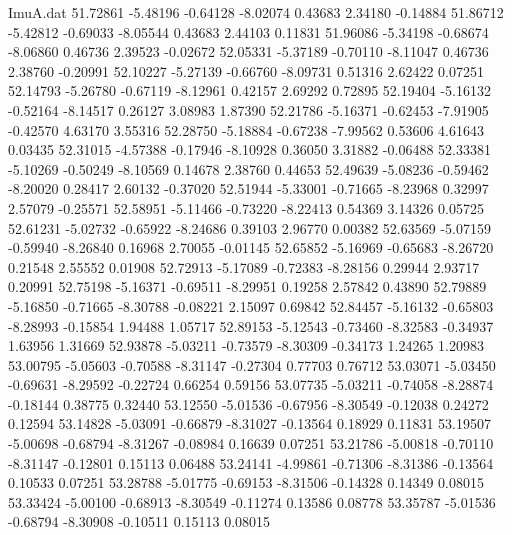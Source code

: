 \begin{filecontents}{ImuA.dat}
  51.72861   -5.48196   -0.64128   -8.02074    0.43683    2.34180   -0.14884
  51.86712   -5.42812   -0.69033   -8.05544    0.43683    2.44103    0.11831
  51.96086   -5.34198   -0.68674   -8.06860    0.46736    2.39523   -0.02672
  52.05331   -5.37189   -0.70110   -8.11047    0.46736    2.38760   -0.20991
  52.10227   -5.27139   -0.66760   -8.09731    0.51316    2.62422    0.07251
  52.14793   -5.26780   -0.67119   -8.12961    0.42157    2.69292    0.72895
  52.19404   -5.16132   -0.52164   -8.14517    0.26127    3.08983    1.87390
  52.21786   -5.16371   -0.62453   -7.91905   -0.42570    4.63170    3.55316
  52.28750   -5.18884   -0.67238   -7.99562    0.53606    4.61643    0.03435
  52.31015   -4.57388   -0.17946   -8.10928    0.36050    3.31882   -0.06488
  52.33381   -5.10269   -0.50249   -8.10569    0.14678    2.38760    0.44653
  52.49639   -5.08236   -0.59462   -8.20020    0.28417    2.60132   -0.37020
  52.51944   -5.33001   -0.71665   -8.23968    0.32997    2.57079   -0.25571
  52.58951   -5.11466   -0.73220   -8.22413    0.54369    3.14326    0.05725
  52.61231   -5.02732   -0.65922   -8.24686    0.39103    2.96770    0.00382
  52.63569   -5.07159   -0.59940   -8.26840    0.16968    2.70055   -0.01145
  52.65852   -5.16969   -0.65683   -8.26720    0.21548    2.55552    0.01908
  52.72913   -5.17089   -0.72383   -8.28156    0.29944    2.93717    0.20991
  52.75198   -5.16371   -0.69511   -8.29951    0.19258    2.57842    0.43890
  52.79889   -5.16850   -0.71665   -8.30788   -0.08221    2.15097    0.69842
  52.84457   -5.16132   -0.65803   -8.28993   -0.15854    1.94488    1.05717
  52.89153   -5.12543   -0.73460   -8.32583   -0.34937    1.63956    1.31669
  52.93878   -5.03211   -0.73579   -8.30309   -0.34173    1.24265    1.20983
  53.00795   -5.05603   -0.70588   -8.31147   -0.27304    0.77703    0.76712
  53.03071   -5.03450   -0.69631   -8.29592   -0.22724    0.66254    0.59156
  53.07735   -5.03211   -0.74058   -8.28874   -0.18144    0.38775    0.32440
  53.12550   -5.01536   -0.67956   -8.30549   -0.12038    0.24272    0.12594
  53.14828   -5.03091   -0.66879   -8.31027   -0.13564    0.18929    0.11831
  53.19507   -5.00698   -0.68794   -8.31267   -0.08984    0.16639    0.07251
  53.21786   -5.00818   -0.70110   -8.31147   -0.12801    0.15113    0.06488
  53.24141   -4.99861   -0.71306   -8.31386   -0.13564    0.10533    0.07251
  53.28788   -5.01775   -0.69153   -8.31506   -0.14328    0.14349    0.08015
  53.33424   -5.00100   -0.68913   -8.30549   -0.11274    0.13586    0.08778
  53.35787   -5.01536   -0.68794   -8.30908   -0.10511    0.15113    0.08015

\end{filecontents}
